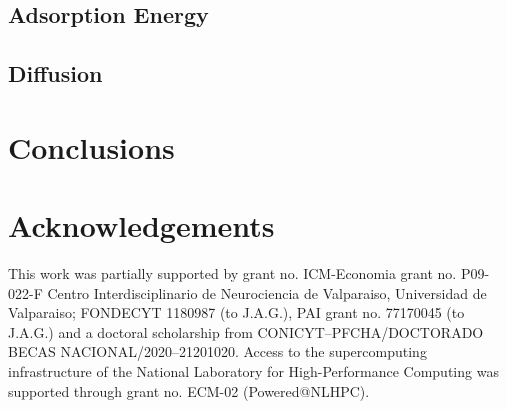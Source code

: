 \documentclass[twoside,twocolumn,9pt]{article}
\begin{document}
\subsection{Adsorption Energy}

\subsection{Diffusion}

\section{Conclusions}


\section*{Acknowledgements}
This work was partially supported by grant no. ICM-Economia grant
no. P09-022-F Centro Interdisciplinario de Neurociencia de Valparaiso,
Universidad de Valparaiso; FONDECYT 1180987 (to J.A.G.), PAI grant
no. 77170045 (to J.A.G.) and a doctoral scholarship from
CONICYT--PFCHA/DOCTORADO BECAS NACIONAL/2020--21201020.  Access to the
supercomputing infrastructure of the National Laboratory for
High-Performance Computing was supported through grant no. ECM-02
(Powered@NLHPC).




\end{document}

